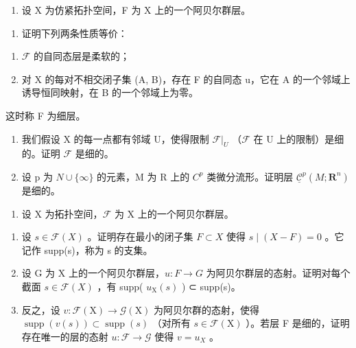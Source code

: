 \exercisegroup

\begin{enumerate}
\def\labelenumi{\arabic{enumi})}
\tightlist
\item
  设 X 为仿紧拓扑空间，F 为 X 上的一个阿贝尔群层。
\end{enumerate}

\begin{enumerate}
\def\labelenumi{\alph{enumi})}
\tightlist
\item
  证明下列两条性质等价：
\end{enumerate}

\begin{enumerate}
\def\labelenumi{(\roman{enumi})}
\item
  \(\mathcal{F}\) 的自同态层是柔软的；
\item
  对 X 的每对不相交闭子集 (A, B)，存在 F 的自同态 u，它在 A 的一个邻域上诱导恒同映射，在 B 的一个邻域上为零。
\end{enumerate}

这时称 F 为细层。

\begin{enumerate}
\def\labelenumi{\alph{enumi})}
\setcounter{enumi}{1}
\item
  我们假设 X 的每一点都有邻域 U，使得限制 \(\mathcal{F}|_{U}\) （\(\mathcal{F}\) 在 U 上的限制）是细的。证明 \(\mathcal{F}\) 是细的。
\item
  设 p 为 \(N \cup \{\infty\}\) 的元素，M 为 R 上的 \(C^{p}\) 类微分流形。证明层 \(\underline{\mathcal{C}}^{p}(M; \mathbf{R}^{n})\) 是细的。
\end{enumerate}

\begin{enumerate}
\def\labelenumi{\arabic{enumi})}
\setcounter{enumi}{1}
\tightlist
\item
  设 X 为拓扑空间，\(\mathcal{F}\) 为 X 上的一个阿贝尔群层。
\end{enumerate}

\begin{enumerate}
\def\labelenumi{\alph{enumi})}
\item
  设 \(s \in \mathcal{F}(X)\) 。证明存在最小的闭子集 \(F \subset X\) 使得 \(s \mid (X - F) = 0\) 。它记作 supp(s)，称为 s 的支集。
\item
  设 G 为 X 上的一个阿贝尔群层，\(u: F \to G\) 为阿贝尔群层的态射。证明对每个截面 \(s \in \mathcal{F}(X)\) ，有 supp( \(u_{\mathrm{X}}(s)\) ) ⊂ supp(s)。
\item
  反之，设 \(v\colon\mathcal{F}(\mathrm{X})\to\mathcal{G}(\mathrm{X})\) 为阿贝尔群的态射，使得 \(\operatorname{supp}(v(s))\subset\operatorname{supp}(s)\) （对所有 \(s\in\mathcal{F}(\mathrm{X})\) ）。若层 F 是细的，证明存在唯一的层的态射 \(u\colon\mathcal{F}\to\mathcal{G}\) 使得 \(v=u_{X}\) 。
\end{enumerate}

